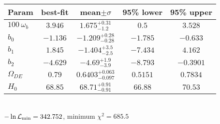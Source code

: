\begin{tabular}{|l|c|c|c|c|} 
 \hline 
Param & best-fit & mean$\pm\sigma$ & 95\% lower & 95\% upper \\ \hline 
$100~\omega_{b }$ &$3.946$ & $1.675_{-1.2}^{+0.31}$ & $0.5$ & $3.528$ \\ 
$b_{0 }$ &$-1.136$ & $-1.209_{-0.28}^{+0.28}$ & $-1.785$ & $-0.633$ \\ 
$b_{1 }$ &$1.845$ & $-1.404_{-2.5}^{+3.5}$ & $-7.434$ & $4.162$ \\ 
$b_{2 }$ &$-4.629$ & $-4.69_{-3.9}^{+1.9}$ & $-8.793$ & $-0.3901$ \\ 
$\Omega_{DE}$ &$0.79$ & $0.6403_{-0.097}^{+0.063}$ & $0.5151$ & $0.7834$ \\ 
$H_{0 }$ &$68.85$ & $68.71_{-0.91}^{+0.91}$ & $66.88$ & $70.53$ \\ 
\hline 
 \end{tabular} \\ 
$-\ln{\cal L}_\mathrm{min} =342.752$, minimum $\chi^2=685.5$ \\ 
